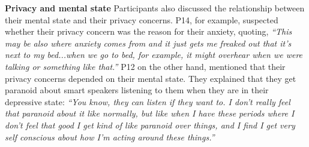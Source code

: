     \textbf{Privacy and mental state}
    Participants also discussed the relationship between their mental state and their privacy concerns.
    P14, for example, suspected whether their privacy concern was the reason for their anxiety, quoting,
	    \textit{%
	    ``This may be also where anxiety comes from and it just gets me freaked out that it's next to my bed...when we go to bed, for example, it might overhear when we were talking or something like that.''
	    }
    P12 on the other hand, mentioned that their privacy concerns depended on their mental state. They explained that they get paranoid about smart speakers listening to them when they are in their depressive state:
            \textit{
            ``You know, they can listen if they want to. I don't really feel that paranoid about it like normally, but like when I have these periods where I don't feel that good I get kind of like paranoid over things, and I find I get very self conscious about how I'm acting around these things.''
            }
        
        

